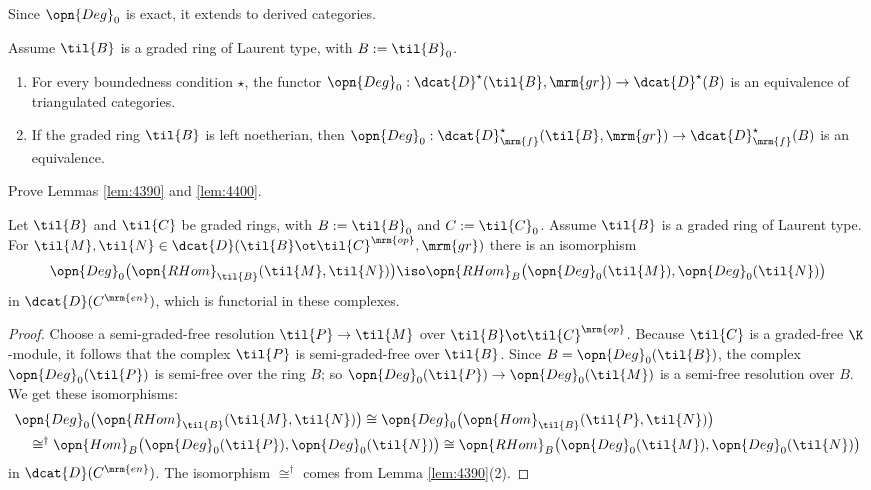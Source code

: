 Since $\opn{Deg}_0$ is exact, it extends to derived categories. 

\begin{lem} \label{lem:4400}
Assume $\til{B}$ is a graded ring of Laurent type, with $B := \til{B}_0$. 
\begin{enumerate}
\item For every boundedness condition $\star$, the functor 
$\opn{Deg}_0 : \dcat{D}^{\star}(\til{B}, \mrm{gr}) \to \dcat{D}^{\star}(B)$
is an equivalence of triangulated categories. 

\item If the graded ring $\til{B}$ is left noetherian, then 
$\opn{Deg}_0 : \dcat{D}^{\star}_{\mrm{f}}(\til{B}, \mrm{gr}) \to 
\dcat{D}^{\star}_{\mrm{f}}(B)$
is an equivalence. 
\end{enumerate}
\end{lem}

\begin{exer} \label{exer:4445}
Prove Lemmas \ref{lem:4390} and \ref{lem:4400}.
\end{exer}

\begin{lem} \label{lem:4401}
Let $\til{B}$ and $\til{C}$ be graded rings, with 
$B := \til{B}_0$ and $C := \til{C}_0$. Assume $\til{B}$ is 
a graded ring of Laurent type.
For $\til{M}, \til{N} \in \dcat{D}(\til{B} \ot \til{C}^{\mrm{op}}, \mrm{gr})$ 
there is an isomorphism 
\[ \opn{Deg}_0 \bigl( \opn{RHom}_{\til{B}}(\til{M}, \til{N}) \bigr) \iso  
\opn{RHom}_{B} \bigl( \opn{Deg}_0(\til{M}), 
\opn{Deg}_0(\til{N}) \bigr) \]
in $\dcat{D}(C^{\mrm{en}})$, which is functorial in these complexes.
\end{lem}

\begin{proof}
Choose a semi-graded-free resolution $\til{P} \to \til{M}$ over 
$\til{B} \ot \til{C}^{\mrm{op}}$. 
Because $\til{C}$ is a graded-free $\K$-module, it follows that the complex 
$\til{P}$ is semi-graded-free over $\til{B}$. 
Since $B = \opn{Deg}_0(\til{B})$, the complex $\opn{Deg}_0(\til{P})$ is 
semi-free over the ring $B$; so 
$\opn{Deg}_0(\til{P}) \to \opn{Deg}_0(\til{M})$
is a semi-free resolution over $B$. 
We get these isomorphisms: 
\[ \begin{aligned}
&
\opn{Deg}_0 \bigl( \opn{RHom}_{\til{B}}(\til{M}, \til{N}) \bigr) 
\cong 
\opn{Deg}_0 \bigl( \opn{Hom}_{\til{B}}(\til{P}, \til{N}) \bigr) 
\\ & \quad 
\cong^{\dag} \opn{Hom}_{B} \bigl( \opn{Deg}_0(\til{P}), \opn{Deg}_0(\til{N}) 
\bigr)
\cong \opn{RHom}_{B} \bigl( \opn{Deg}_0(\til{M}), \opn{Deg}_0(\til{N}) \bigr) 
\end{aligned} \]
in $\dcat{D}(C^{\mrm{en}})$. 
The isomorphism $\cong^{\dag}$ comes from Lemma \ref{lem:4390}(2). 
\end{proof}

